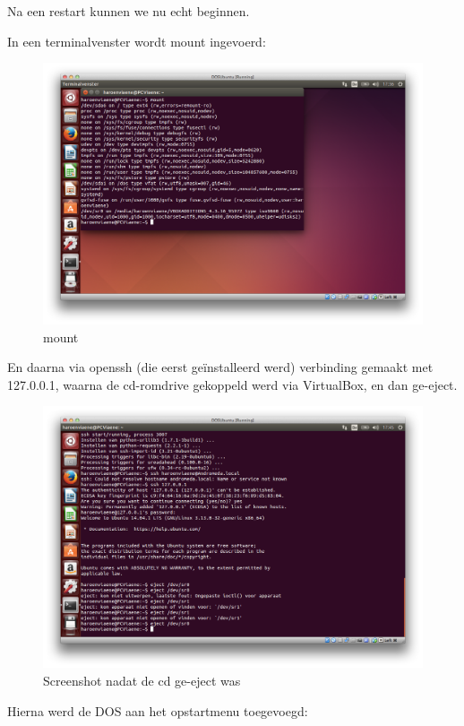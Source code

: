 \documentclass[11pt, a4paper]{article}
\begin{document}
Na een restart kunnen we nu echt beginnen. 

In een terminalvenster wordt mount ingevoerd: 

\begin{figure}[H]
	\centering
	\includegraphics[width=\textwidth]{./IMG/ZA}
	\caption{mount}
\end{figure}

En daarna via openssh (die eerst ge\"installeerd werd) verbinding gemaakt met 127.0.0.1, waarna de cd-romdrive gekoppeld werd via VirtualBox, en dan ge-eject. 

\begin{figure}[H]
	\centering
	\includegraphics[width=\textwidth]{./IMG/ZB}
	\caption{Screenshot nadat de cd ge-eject was}
\end{figure}

Hierna werd de DOS aan het opstartmenu toegevoegd:
\end{document}
